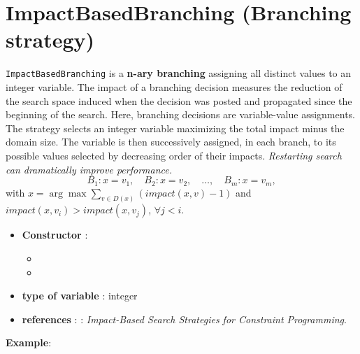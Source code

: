 \section{ImpactBasedBranching (Branching strategy)}\label{impact:impactbranchstrat}\hypertarget{impact:impactbranchstrat}{}
\begin{notedef}
  \texttt{ImpactBasedBranching} is a \textbf{n-ary branching} assigning all distinct values to an integer variable. 
  The impact of a branching decision measures the reduction of the search space induced when the decision was posted and propagated since the beginning of the search.
  Here, branching decisions are variable-value assignments. 
The strategy selects an integer variable maximizing the total impact minus the domain size. The variable is then successively assigned, in each branch, to its possible values selected by decreasing order of their impacts. 
  \emph{Restarting search can dramatically improve performance.}
$$B_1: x=v_1,\quad B_2: x= v_2,\quad\ldots,\quad B_m: x= v_m,$$
with $x=\arg\max\sum_{v\in D(x)}(impact(x,v)-1)$  and $impact(x,v_i) > impact(x,v_j)$, $\forall j<i$.
\end{notedef}

\begin{itemize}
	\item \textbf{Constructor} :
	\begin{itemize}
	\item {}
	\item {}
	\end{itemize}	
	\item \textbf{type of variable} : integer
	\item \textbf{references} : \cite{Refalo04}: \emph{Impact-Based Search Strategies for Constraint Programming}. 
\end{itemize}

\textbf{Example}:
%

